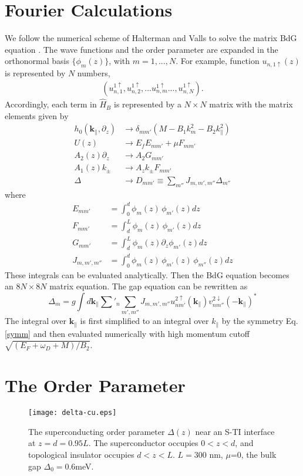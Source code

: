 \documentclass[11pt]{report}
\newcommand{\kperp}{\mathbf{k}_\parallel}
\begin{document}
\section{Fourier Calculations}
We follow the numerical scheme of Halterman and Valls to solve 
the matrix BdG equation \cite{h-v}. The wave functions and the order parameter
are expanded in the orthonormal basis $\{\phi_m(z)\}$, with $m=1,...,N$. For example,
function $u_{n,1\uparrow}(z)$ is represented by $N$ numbers,
\begin{align*}
(u^{1\uparrow}_{n,1},u^{1\uparrow}_{n,2},...u^{1\uparrow}_{n,m}...,u^{1\uparrow}_{n,N}).
\end{align*}
Accordingly, each term in $\hat{H}_{B}$ is represented
by a $N\times N$ matrix with the matrix elements given by
\begin{align*}
h_0(\kperp,\partial_z) &\rightarrow \delta_{mm'}(M - B_1 k_m^2 - B_2 k_\parallel^2) \\
U(z) &\rightarrow E_f E_{mm'} + \mu F_{mm'} \\
 A_2(z) \partial_z &\rightarrow A_2 G_{mm'}\\
 A_1(z) k_\pm &\rightarrow A_z k_\pm F_{mm'} \\
 \Delta &\rightarrow D_{mm'}\equiv \sum_{m''}J_{m,m',m''}\Delta_{m''}
\end{align*}
where 
\begin{align*}
E_{mm'}&=\int_0^{d} \phi_m(z) \, \phi_{m'}(z) dz \\
F_{mm'}&=\int_d^{L} \phi_m(z) \, \phi_{m'}(z) dz \\
G_{mm'}&=\int_d^{L} \phi_m(z) \partial_z \phi_{m'}(z) dz\\
J_{m,m',m''}&=\int_0^{d} \phi_m(z) \, \phi_{m'}(z) \, \phi_{m''}(z) dz
\end{align*}
These integrals can be evaluated analytically. Then the BdG equation becomes
an $8N\times 8N$ matrix equation. The gap equation can be rewritten as
\[
\Delta_{m}=g\int d\kperp \sum'_n \sum_{m',m''} J_{m,m',m''}
u^{2\uparrow}_{nm'}(\kperp)v^{2\downarrow}_{nm''}(-\kperp)^* 
\]
The integral over $\kperp$ is first simplified to an integral over $k_\parallel$
by the symmetry Eq. \eqref{symm} and then evaluated numerically with high 
momentum cutoff 
$\sqrt{(E_F+\omega_D+M)/B_2}$.


\section{The Order Parameter}

\begin{figure}
\texttt{[image: delta-cu.eps]}
\caption{The superconducting order parameter $\Delta(z)$ near an S-TI interface at $
z=d=0.95L$. The superconductor occupies $0<z<d$, and topological insulator occupies $d<z<L$. 
$L=300$ nm, $\mu$=0, the bulk gap $\Delta_0=$0.6meV. }\label{delta-cu}
\end{figure}
\end{document}
